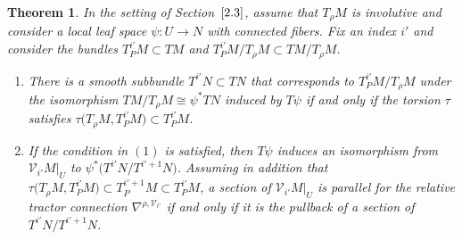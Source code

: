 \documentclass[pdftex]{sigma}
\numberwithin{equation}{section}
\newtheorem{Theorem}{Theorem}[section]
\def\Cal{\mathcal}
\newcommand{\ps}{\psi}
\begin{document}
\begin{Theorem}\label{thm3.2.2}
In the setting of Section~$\ref{2.3}$, assume that $T_\rho M$ is involutive and consider a
local leaf space $\ps\colon U\to N$ with connected fibers. Fix an index $i'$ and consider
the bundles $T^{i'}_PM\subset TM$ and $T^{i'}_PM/T_\rho M\subset TM/T_\rho M$.
\begin{enumerate}\itemsep=0pt
\item[$(1)$] There is a smooth subbundle $T^{i'}N\subset TN$ that corresponds to
$T^{i'}_PM/T_\rho M$ under the isomorphism $TM/T_\rho M\cong\psi^*TN$ induced by
$T\psi$ if and only if the torsion $\tau$ satisfies $\tau\bigl(T_\rho M,T^{i'}_PM\bigr)\subset
T^{i'}_PM$.

\item[$(2)$] If the condition in $(1)$ is satisfied, then $T\psi$ induces an isomorphism from $\Cal
V_{i'}M|_U$ to $\psi^*\bigl(T^{i'}N/T^{i'+1}N\bigr)$. Assuming in addition that $\tau\bigl(T_\rho
M,T^{i'}_PM\bigr)\subset T^{i'+1}_PM\subset T^{i'}_PM$, a section of $\Cal V_{i'}M|_U$ is
parallel for the relative tractor connection $\nabla^{\rho,\Cal V_{i'}}$ if and only if it
is the pullback of a section of $T^{i'}N/T^{i'+1}N$.
\end{enumerate}
\end{Theorem}
\end{document}
